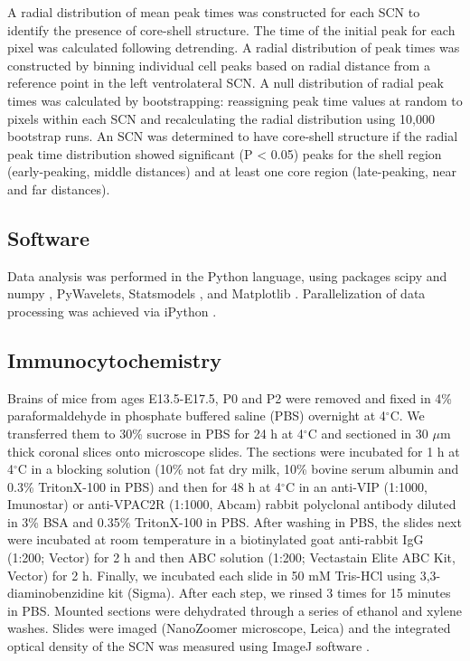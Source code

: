 A radial distribution of mean peak times was constructed for each SCN to identify the presence of core-shell structure.
The time of the initial peak for each pixel was calculated following detrending.
A radial distribution of peak times was constructed by binning individual cell peaks based on radial distance from a reference point in the left ventrolateral SCN.
A null distribution of radial peak times was calculated by bootstrapping: reassigning peak time values at random to pixels within each SCN and recalculating the radial distribution using 10,000 bootstrap runs.
An SCN was determined to have core-shell structure if the radial peak time distribution showed significant (P < 0.05) peaks for the shell region (early-peaking, middle distances) and at least one core region (late-peaking, near and far distances). 

\subsection*{Software}
Data analysis was performed in the Python language, using packages scipy and numpy \cite{jones2014scipy}, PyWavelets, Statsmodels \cite{Seabold2010}, and Matplotlib \cite{Hunter2007}.
Parallelization of data processing was achieved via iPython \cite{Perez2007}.

\subsection*{Immunocytochemistry}
Brains of mice from ages E13.5-E17.5, P0 and P2 were removed and fixed in 4\% paraformaldehyde in phosphate buffered saline (PBS) overnight at 4$^\circ$C.
We transferred them to 30\% sucrose in PBS for 24 h at 4$^\circ$C and sectioned in 30 $\mu$m thick coronal slices onto microscope slides.
The sections were incubated for 1 h at 4$^\circ$C in a blocking solution (10\% not fat dry milk, 10\% bovine serum albumin and 0.3\% TritonX-100 in PBS) and then for 48 h at 4$^\circ$C in an anti-VIP (1:1000, Imunostar) or anti-VPAC2R (1:1000, Abcam) rabbit polyclonal antibody diluted in 3\% BSA and 0.35\% TritonX-100 in PBS.
After washing in PBS, the slides next were incubated at room temperature in a biotinylated goat anti-rabbit IgG (1:200; Vector) for 2 h and then ABC solution (1:200; Vectastain Elite ABC Kit, Vector) for 2 h.
Finally, we incubated each slide in 50 mM Tris-HCl using 3,3-diaminobenzidine kit (Sigma).
After each step, we rinsed 3 times for 15 minutes in PBS.
Mounted sections were dehydrated through a series of ethanol and xylene washes.
Slides were imaged (NanoZoomer microscope, Leica) and the integrated optical density of the SCN was measured using ImageJ software \cite{Schneider2012}.


